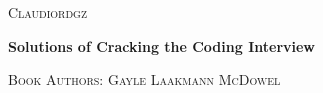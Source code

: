 \newcommand{\HRule}{\rule{\linewidth}{0.2mm}}
\begin{titlepage}
\begin{center}

\begin{LOGOWEBPAGE}

\end{LOGOWEBPAGE}
\begin{navbartext}
	\textsc{Claudiordgz}\\[0.1cm]
\end{navbartext}
\vfill
\begin{navbartext}
	\Large \bfseries Solutions of Cracking the Coding Interview\\[1cm]
\end{navbartext}
\begin{navbartext}
	\textsc{Book Authors: Gayle Laakmann McDowel}\\[0.1cm]
\end{navbartext}

\end{center}
\end{titlepage}